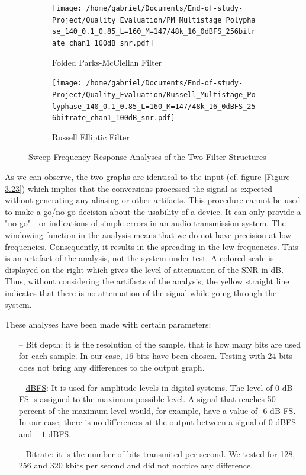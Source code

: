 \begin{figure}[ht]
	\begin{subfigure}[b]{0.5\textwidth}
		\texttt{[image: /home/gabriel/Documents/End-of-study-Project/Quality\_Evaluation/PM\_Multistage\_Polyphase\_140\_0.1\_0.85\_L=160\_M=147/48k\_16\_0dBFS\_256bitrate\_chan1\_100dB\_snr.pdf]}
		\caption{Folded Parks-McClellan Filter}
		
	\end{subfigure}
	\hfill
	\begin{subfigure}[b]{0.5\textwidth}
		\texttt{[image: /home/gabriel/Documents/End-of-study-Project/Quality\_Evaluation/Russell\_Multistage\_Polyphase\_140\_0.1\_0.85\_L=160\_M=147/48k\_16\_0dBFS\_256bitrate\_chan1\_100dB\_snr.pdf]}
		\caption{Russell Elliptic Filter}
		
	\end{subfigure}
	\captionsetup{width=0.95\linewidth}
	\caption{Sweep Frequency Response Analyses of the Two Filter Structures}\label{Figure 3.24}
\end{figure}

As we can observe, the two graphs are identical to the input (cf. figure \ref{Figure 3.23}) which implies that the conversions processed the signal as expected without generating any aliasing or other artifacts. This procedure cannot be used to make a go/no-go
 decision about the usability of a device. It can only provide a "no-go" - or indications of simple errors in an audio transmission system. The windowing function in the analysis means that we do not have precision at low frequencies. Consequently, it results in the spreading in the low frequencies. This is an artefact of the analysis, not the system under test. A colored scale is displayed on the right which gives the level of attenuation of the \hyperlink{SNR}{SNR} in \si{dB}. Thus, without considering the artifacts of the analysis, the yellow straight line indicates that there is no attenuation of the signal while going through the system. 
 


These analyses have been made with certain parameters:
\begin{itemize}
	\item[--] Bit depth: it is the resolution of the sample, that is how many bits are used for each sample. In our case, $16$ bits have been chosen. Testing with 24 bits does not bring any differences to the output graph.
	\item[--] \hyperlink{dB FS}{dBFS}: It is used for amplitude levels in digital systems. The level of 0 dB FS is assigned to the maximum possible level. A signal that reaches 50 percent of the maximum level would, for example, have a value of -6 dB FS. In our case, there is no differences at the output between a signal of 0 dBFS and $-1$ dBFS.
	\item[--] Bitrate: it is the number of bits transmited per second. We tested for 128, 256 and 320 kbits per second and did not noctice any difference. 
\end{itemize}

